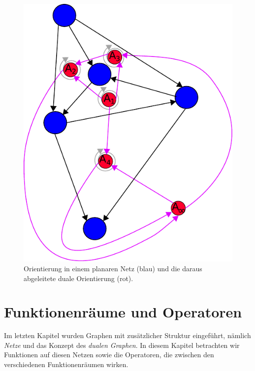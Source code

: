 \documentclass[11pt,a4paper,leqno]{report}
\numberwithin{equation}{chapter}
\begin{document}
\begin{figure}[H]
	\begin{center}
		\includegraphics[scale=0.4]{Abbildungen/graph_1_dual_orient.pdf}
		\caption{Orientierung in einem planaren Netz (blau) und die daraus abgeleitete duale Orientierung (rot).}
	\end{center}
\end{figure}


\chapter{Funktionenräume und Operatoren}

Im letzten Kapitel wurden Graphen mit zusätzlicher Struktur eingeführt, nämlich \emph{Netze} und das Konzept des \emph{dualen Graphen}. 
In diesem Kapitel betrachten wir Funktionen auf diesen Netzen sowie die Operatoren, die zwischen den verschiedenen Funktionenräumen wirken. 
\end{document}
